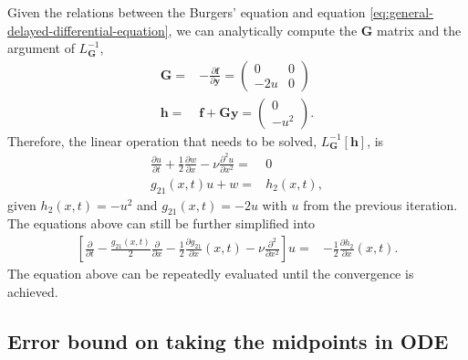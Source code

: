 Given the relations between the Burgers' equation and equation \ref{eq:general-delayed-differential-equation}, we can analytically compute the $\mathbf{G}$ matrix and the argument of $L_\mathbf{G}^{-1}$,
\begin{align}
    \mathbf{G} =& -\frac{\partial \mathbf{f}}{\partial \mathbf{y}} = \left(\begin{matrix}
        0 & 0 \\
        -2u & 0
    \end{matrix}\right) \\
    \mathbf{h} =& \mathbf{f} + \mathbf{Gy} = \left(\begin{matrix}
        0 \\
        -u^2
    \end{matrix}\right).
\end{align}
Therefore, the linear operation that needs to be solved, $L_\mathbf{G}^{-1}[\mathbf{h}]$, is
\begin{align}
    \frac{\partial u}{\partial t} + \frac{1}{2}\frac{\partial w}{\partial x} - \nu \frac{\partial^2 u}{\partial x^2} =& 0 \\
    g_{21}(x, t) u + w =& h_2(x, t),
\end{align}
given $h_2(x, t) = -u^2$ and $g_{21}(x, t) = -2u$ with $u$ from the previous iteration.
The equations above can still be further simplified into
\begin{align}
    \left[\frac{\partial}{\partial t} - \frac{g_{21}(x, t)}{2}\frac{\partial}{\partial x} - \frac{1}{2}\frac{\partial g_{21}}{\partial x}(x, t) - \nu \frac{\partial^2}{\partial x^2}\right] u =& -\frac{1}{2}\frac{\partial h_2}{\partial x}(x, t).
\end{align}
The equation above can be repeatedly evaluated until the convergence is achieved.

\subsection{Error bound on taking the midpoints in ODE}
\label{appsec:error-bound-midpoints-ode}

